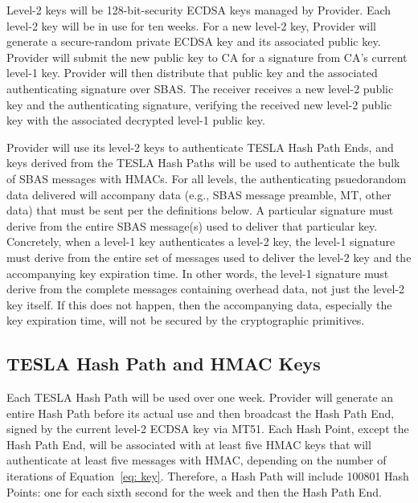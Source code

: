 \documentclass[APA,STIX1COL]{IONjournal/ION-APA Template}
\begin{document}
		Level-2 keys will be 128-bit-security ECDSA keys managed by Provider.
		Each level-2 key will be in use for ten weeks.
		For a new level-2 key, Provider will generate a secure-random private ECDSA key and its associated public key.
		Provider will submit the new public key to CA for a signature from CA's current level-1 key.
		Provider will then distribute that public key and the associated authenticating signature over SBAS.
		The receiver receives a new level-2 public key and the authenticating signature, verifying the received new level-2 public key with the associated decrypted level-1 public key.

		Provider will use its level-2 keys to authenticate TESLA Hash Path Ends, and keys derived from the TESLA Hash Paths will be used to authenticate the bulk of SBAS messages with HMACs.
		For all levels, the authenticating psuedorandom data delivered will accompany data (e.g., SBAS message preamble, MT, other data) that must be sent per the definitions below.
		A particular signature must derive from the entire SBAS message(s) used to deliver that particular key.
		Concretely, when a level-1 key authenticates a level-2 key, the level-1 signature must derive from the entire set of messages used to deliver the level-2 key and the accompanying key expiration time. 
		In other words, the level-1 signature must derive from the complete messages containing overhead data, not just the level-2 key itself.
		If this does not happen, then the accompanying data, especially the key expiration time, will not be secured by the cryptographic primitives.

	\subsection{TESLA Hash Path and HMAC Keys} \label{sub:tesla_hash_path}

		Each TESLA Hash Path will be used over one week.
		Provider will generate an entire Hash Path before its actual use and then broadcast the Hash Path End, signed by the current level-2 ECDSA key via MT51.
		Each Hash Point, except the Hash Path End, will be associated with at least five HMAC keys that will authenticate at least five messages with HMAC, depending on the number of iterations of Equation~\eqref{eq: key}.
		Therefore, a Hash Path will include 100801 Hash Points: one for each sixth second for the week and then the Hash Path End.
\end{document}
